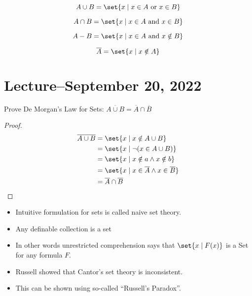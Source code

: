 \documentclass{scrreprt}
\begin{document}
\begin{definition}
	\[
		A \cup B = \set{x\mid x\in A \text{ or } x\in B}
	\]
\end{definition}

\begin{definition}[Intersection]
	\[
		A \cap B = \set{x\mid x\in A \text{ and } x\in B}
	\]
\end{definition}

\begin{definition}[Difference]
	\[
		A - B = \set{x\mid x\in A \text{ and } x\notin B}
	\]
\end{definition}

\begin{definition}[Complement]
	\[
		\overline{A} = \set{x\mid x\notin A}
	\]
\end{definition}

\section{Lecture--September 20, 2022}

Prove De Morgan's Law for Sets: $\overline{A\cup B} = \overline{A}\cap \overline{B}$

\begin{proof}
	\begin{align}
		\overline{A\cup B} & = \set{x\mid x\notin A\cup B}                             \\
		                   & = \set{x \mid \neg(x\in A\cup B)}                         \\
		                   & = \set{x \mid x \notin a \land x\notin b}                 \\
		                   & = \set{x \mid x \in \overline{A} \land x\in \overline{B}} \\
		                   & = \overline{A}\cap \overline{B}
	\end{align}
\end{proof}

\begin{itemize}
	\item Intuitive formulation for sets is called naive set theory.
	\item Any definable collection is a set
	\item In other words unrestricted comprehension says that $\set{x\mid F(x)}$ is a Set
	      for any formula $F$.
	\item Russell showed that Cantor's set theory is inconsistent.
	\item This can be shown using so-called ``Russell's Paradox''.
\end{itemize}
\end{document}
